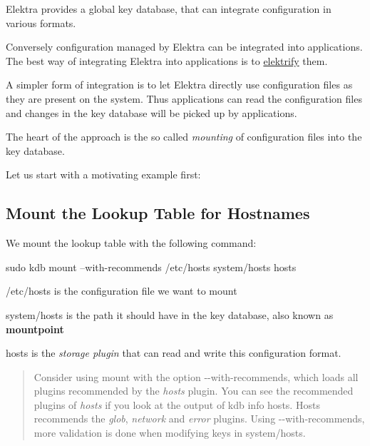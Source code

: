 Elektra provides a global key database, that can integrate configuration in various formats.

Conversely configuration managed by Elektra can be integrated into applications. The best way of integrating Elektra into applications is to \hyperlink{md_doc_help_elektra-glossary_doc_help_elektra-glossary_md}{elektrify} them.

A simpler form of integration is to let Elektra directly use configuration files as they are present on the system. Thus applications can read the configuration files and changes in the key database will be picked up by applications.

The heart of the approach is the so called {\itshape mounting} of configuration files into the key database.

Let us start with a motivating example first\+:

\subsection*{Mount the Lookup Table for Hostnames}

We mount the lookup table with the following command\+:


\begin{DoxyCode}
sudo kdb mount --with-recommends /etc/hosts system/hosts hosts
\end{DoxyCode}



\begin{DoxyEnumerate}
\item {\ttfamily /etc/hosts} is the configuration file we want to mount
\item {\ttfamily system/hosts} is the path it should have in the key database, also known as {\bfseries mountpoint}
\item {\ttfamily hosts} is the {\itshape storage plugin} that can read and write this configuration format.
\end{DoxyEnumerate}

\begin{quote}
Consider using mount with the option {\ttfamily -\/-\/with-\/recommends}, which loads all plugins recommended by the {\itshape hosts} plugin. You can see the recommended plugins of {\itshape hosts} if you look at the output of {\ttfamily kdb info hosts}. Hosts recommends the {\itshape glob}, {\itshape network} and {\itshape error} plugins. Using {\ttfamily -\/-\/with-\/recommends}, more validation is done when modifying keys in {\ttfamily system/hosts}. \end{quote}


